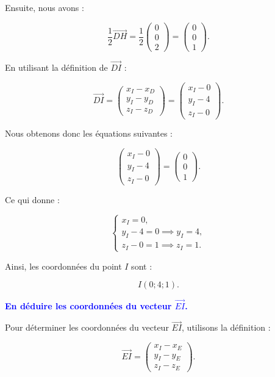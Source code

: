 \documentclass{exam}
\begin{document}
\begin{questions}
Ensuite, nous avons :

\[
\frac{1}{2} \overrightarrow{DH} =
\frac{1}{2} \begin{pmatrix}
0 \\
0 \\
2
\end{pmatrix}
=
\begin{pmatrix}
0 \\
0 \\
1
\end{pmatrix}.
\]

En utilisant la définition de $\overrightarrow{DI}$ :

\[
\overrightarrow{DI} = 
\begin{pmatrix}
x_I - x_D \\
y_I - y_D \\
z_I - z_D
\end{pmatrix}
=
\begin{pmatrix}
x_I - 0 \\
y_I - 4 \\
z_I - 0
\end{pmatrix}.
\]

Nous obtenons donc les équations suivantes :

\[
\begin{pmatrix}
x_I - 0 \\
y_I - 4 \\
z_I - 0
\end{pmatrix}
=
\begin{pmatrix}
0 \\
0 \\
1
\end{pmatrix}.
\]

Ce qui donne :

\[
\left\{
\begin{array}{l}
x_I = 0, \\
y_I - 4 = 0 \implies y_I = 4, \\
z_I - 0 = 1 \implies z_I = 1.
\end{array}
\right.
\]

Ainsi, les coordonnées du point $I$ sont :

\[
I(0 ; 4 ; 1).
\]
    


    \question[0.5] \textbf{\textcolor{blue}{En déduire les coordonnées du vecteur $\overrightarrow{EI}$.}}

    Pour déterminer les coordonnées du vecteur $\overrightarrow{EI}$, utilisons la définition :

\[
\overrightarrow{EI} = 
\begin{pmatrix}
x_I - x_E \\
y_I - y_E \\
z_I - z_E
\end{pmatrix}.
\]


\end{questions}
\end{document}
